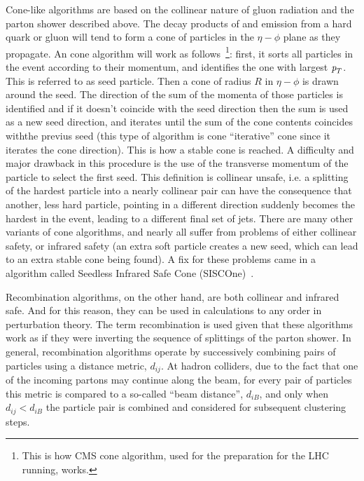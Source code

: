 Cone-like algorithms are based on the collinear nature of gluon radiation and the parton shower described above. The decay products of and emission from a hard quark or gluon will tend to form a cone of particles in the $\eta - \phi$ plane as they propagate.
An cone algorithm will work as follows~\footnote{This is how CMS cone algorithm, used for the preparation for the LHC running, works.}: first, it sorts all particles in the event according to their momentum, and identifies the one with largest ${\emph{p}_{T}}$. This is referred to as seed particle. Then a cone of radius $R$ in  $\eta - \phi$ is drawn around the seed. The direction of the sum of the momenta of those particles is identified and if it doesn't coincide with the seed direction then the sum is used as a new seed direction, and iterates until the sum of the cone contents coincides withthe previus seed (this type of algorithm is cone ``iterative'' cone since it iterates the cone direction). This is how a stable cone is reached. A difficulty and major drawback in this procedure is the use of the transverse momentum of the particle to select the first seed. This definition is collinear unsafe, i.e. a splitting of the hardest particle into a nearly collinear pair can have the consequence that another, less hard particle, pointing in a different direction suddenly becomes the hardest in the event, leading to a different final set of jets. There are many other variants of cone algorithms, and nearly all suffer from problems of either collinear safety, or infrared safety (an extra soft particle creates a new seed, which can lead to an extra stable cone being found). A fix for these problems came in a algorithm called Seedless Infrared Safe Cone (SISCOne)~\cite{SISCone}.


Recombination algorithms, on the other hand, are both collinear and infrared safe. And for this reason, they can be used in calculations to any order in perturbation theory. The term recombination is used given that these algorithms work as if they were inverting the sequence of splittings of the parton shower. In general, recombination algorithms operate by successively combining pairs of particles using a distance metric, $d_{ij}$.  At hadron colliders, due to the fact that one of the incoming partons may continue along the beam, for every pair of particles this metric is compared to a so-called ``beam distance'', $d_{iB}$, and only when  $d_{ij}<d_{iB}$ the particle pair is combined and considered for subsequent clustering steps. 

